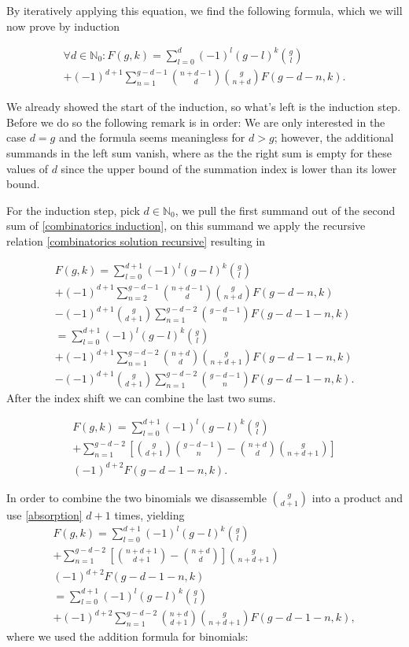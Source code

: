 \documentclass[b5paper,draft,openbib,12pt]{memoir}
\begin{document}
By iteratively applying this equation, we find the following formula, which we will now prove by induction

\begin{multline}\label{combinatorics induction}
\forall d\in\mathbb{N}_0: F(g,k)=\sum_{l=0}^d (-1)^l (g-l)^k \binom{g}{l}\\
+(-1)^{d+1} \sum_{n=1}^{g-d-1} \binom{n+d-1}{d} \binom{g}{n+d} F(g-d-n,k).
\end{multline}

We already showed the start of the induction, so what's left is the induction step. Before we do so the
following remark is in order: We are only interested in the case \(d=g\) and the formula seems meaningless
for \(d>g\); however, the additional summands in the left sum vanish, where as the the right sum is empty
for these values of \(d\) since the  upper bound of the summation index is lower than its lower bound.

For the induction step, pick \(d\in\mathbb{N}_0\), we pull the first summand out of the second sum 
of \eqref{combinatorics induction},
on this summand we apply the recursive relation \eqref{combinatorics solution recursive} resulting in

\begin{multline}
F(g,k)=\sum_{l=0}^{d+1} (-1)^l (g-l)^k \binom{g}{l}\\
+(-1)^{d+1} \sum_{n=2}^{g-d-1} \binom{n+d-1}{d} \binom{g}{n+d} F(g-d-n,k)\\
-(-1)^{d+1} \binom{g}{d+1} \sum_{n=1}^{g-d-2} \binom{g-d-1}{n} F(g-d-1-n,k)\\
=\sum_{l=0}^{d+1} (-1)^l (g-l)^k \binom{g}{l}\\
+(-1)^{d+1} \sum_{n=1}^{g-d-2} \binom{n+d}{d} \binom{g}{n+d+1} F(g-d-1-n,k)\\
-(-1)^{d+1} \binom{g}{d+1} \sum_{n=1}^{g-d-2} \binom{g-d-1}{n} F(g-d-1-n,k).
\end{multline}
After the index shift we can combine the last two sums. 

\begin{multline}
F(g,k)= \sum_{l=0}^{d+1} (-1)^l (g-l)^k \binom{g}{l}\\
+ \sum_{n=1}^{g-d-2}\left[\binom{g}{d+1} \binom{g-d-1}{n} - \binom{n+d}{d} \binom{g}{n+d+1} \right] 
\\(-1)^{d+2} F(g-d-1-n,k).
\end{multline}


In order to combine the two binomials we disassemble \(\binom{g}{d+1}\) into a product and use
 \eqref{absorption}  \(d+1\) times, yielding
\begin{multline}
F(g,k)= \sum_{l=0}^{d+1} (-1)^l (g-l)^k \binom{g}{l}\\
+ \sum_{n=1}^{g-d-2}\left[\binom{n+d+1}{d+1} - \binom{n+d}{d}\right] \binom{g}{n+d+1} 
\\(-1)^{d+2} F(g-d-1-n,k)\\
=\sum_{l=0}^{d+1} (-1)^l (g-l)^k \binom{g}{l}\\
+(-1)^{d+2}  \sum_{n=1}^{g-d-2} \binom{n+d}{d+1} \binom{g}{n+d+1}  F(g-d-1-n,k),
\end{multline}
where we used the addition formula for binomials:
\end{document}
